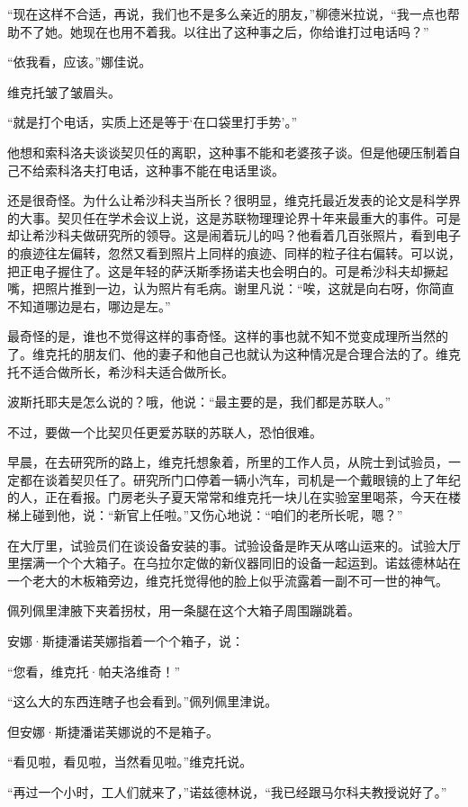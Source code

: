 “现在这样不合适，再说，我们也不是多么亲近的朋友，”柳德米拉说，“我一点也帮助不了她。她现在也用不着我。以往出了这种事之后，你给谁打过电话吗？”

“依我看，应该。”娜佳说。

维克托皱了皱眉头。

“就是打个电话，实质上还是等于‘在口袋里打手势’。”

他想和索科洛夫谈谈契贝任的离职，这种事不能和老婆孩子谈。但是他硬压制着自己不给索科洛夫打电话，这种事不能在电话里谈。

还是很奇怪。为什么让希沙科夫当所长？很明显，维克托最近发表的论文是科学界的大事。契贝任在学术会议上说，这是苏联物理理论界十年来最重大的事件。可是却让希沙科夫做研究所的领导。这是闹着玩儿的吗？他看着几百张照片，看到电子的痕迹往左偏转，忽然又看到照片上同样的痕迹、同样的粒子往右偏转。可以说，把正电子握住了。这是年轻的萨沃斯季扬诺夫也会明白的。可是希沙科夫却撅起嘴，把照片推到一边，认为照片有毛病。谢里凡说：“唉，这就是向右呀，你简直不知道哪边是右，哪边是左。”

最奇怪的是，谁也不觉得这样的事奇怪。这样的事也就不知不觉变成理所当然的了。维克托的朋友们、他的妻子和他自己也就认为这种情况是合理合法的了。维克托不适合做所长，希沙科夫适合做所长。

波斯托耶夫是怎么说的？哦，他说：“最主要的是，我们都是苏联人。”

不过，要做一个比契贝任更爱苏联的苏联人，恐怕很难。

早晨，在去研究所的路上，维克托想象着，所里的工作人员，从院士到试验员，一定都在谈着契贝任了。研究所门口停着一辆小汽车，司机是一个戴眼镜的上了年纪的人，正在看报。门房老头子夏天常常和维克托一块儿在实验室里喝茶，今天在楼梯上碰到他，说：“新官上任啦。”又伤心地说：“咱们的老所长呢，嗯？”

在大厅里，试验员们在谈设备安装的事。试验设备是昨天从喀山运来的。试验大厅里摆满一个个大箱子。在乌拉尔定做的新仪器同旧的设备一起运到。诺兹德林站在一个老大的木板箱旁边，维克托觉得他的脸上似乎流露着一副不可一世的神气。

佩列佩里津腋下夹着拐杖，用一条腿在这个大箱子周围蹦跳着。

安娜·斯捷潘诺芙娜指着一个个箱子，说：

“您看，维克托·帕夫洛维奇！”

“这么大的东西连瞎子也会看到。”佩列佩里津说。

但安娜·斯捷潘诺芙娜说的不是箱子。

“看见啦，看见啦，当然看见啦。”维克托说。

“再过一个小时，工人们就来了，”诺兹德林说，“我已经跟马尔科夫教授说好了。”

